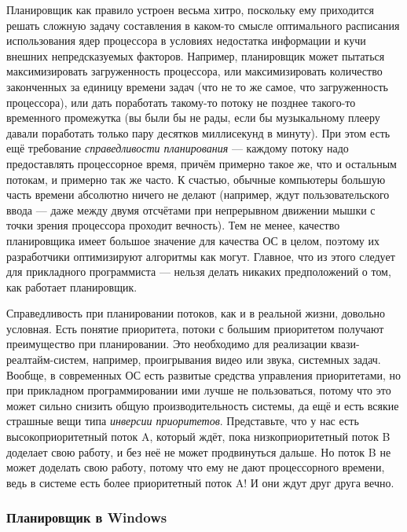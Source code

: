 \documentclass{../../text-style}
\begin{document}
Планировщик как правило устроен весьма хитро, поскольку ему приходится решать сложную задачу составления в каком-то смысле оптимального расписания использования ядер процессора в условиях недостатка информации и кучи внешних непредсказуемых факторов. Например, планировщик может пытаться максимизировать загруженность процессора, или максимизировать количество законченных за единицу времени задач (что не то же самое, что загруженность процессора), или дать поработать такому-то потоку не позднее такого-то временного промежутка (вы были бы не рады, если бы музыкальному плееру давали поработать только пару десятков миллисекунд в минуту). При этом есть ещё требование \textit{справедливости планирования} --- каждому потоку надо предоставлять процессорное время, причём примерно такое же, что и остальным потокам, и примерно так же часто. К счастью, обычные компьютеры большую часть времени абсолютно ничего не делают (например, ждут пользовательского ввода --- даже между двумя отсчётами при непрерывном движении мышки с точки зрения процессора проходит вечность). Тем не менее, качество планировщика имеет большое значение для качества ОС в целом, поэтому их разработчики оптимизируют алгоритмы как могут. Главное, что из этого следует для прикладного программиста --- нельзя делать никаких предположений о том, как работает планировщик.

Справедливость при планировании потоков, как и в реальной жизни, довольно условная. Есть понятие приоритета, потоки с большим приоритетом получают преимущество при планировании. Это необходимо для реализации квази-реалтайм-систем, например, проигрывания видео или звука, системных задач. Вообще, в современных ОС есть развитые средства управления приоритетами, но при прикладном программировании ими лучше не пользоваться, потому что это может сильно снизить общую производительность системы, да ещё и есть всякие страшные вещи типа \textit{инверсии приоритетов}. Представьте, что у нас есть высокоприоритетный поток A, который ждёт, пока низкоприоритетный поток B доделает свою работу, и без неё не может продвинуться дальше. Но поток B не может доделать свою работу, потому что ему не дают процессорного времени, ведь в системе есть более приоритетный поток A! И они ждут друг друга вечно.

\subsubsection{Планировщик в Windows}
\end{document}
